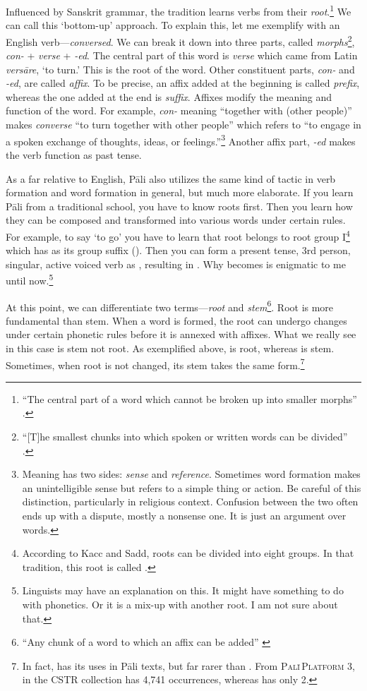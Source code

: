 Influenced by Sanskrit grammar, the tradition learns verbs from their \emph{root}.\footnote{``The central part of a word which cannot be broken up into smaller morphs'' \citep[p.~389]{brownmiller:dict}.} We can call this `bottom-up' approach. To explain this, let me exemplify with an English verb---\emph{conversed}. We can break it down into three parts, called \emph{morphs}\footnote{``[T]he smallest chunks into which spoken or written words can be divided'' \citep[p.~294]{brownmiller:dict}.}, \emph{con-} + \emph{verse} + \emph{-ed}. The central part of this word is \emph{verse} which came from Latin \emph{vers\=are}, `to turn.' This is the root of the word. Other constituent parts, \emph{con-} and \emph{-ed}, are called \emph{affix}. To be precise, an affix added at the beginning is called \emph{prefix}, whereas the one added at the end is \emph{suffix}. Affixes modify the meaning and function of the word. For example, \emph{con-} meaning ``together with (other people)'' makes \emph{converse} ``to turn together with other people'' which refers to ``to engage in a spoken exchange of thoughts, ideas, or feelings.''\footnote{Meaning has two sides: \emph{sense} and \emph{reference}. Sometimes word formation makes an unintelligible sense but refers to a simple thing or action. Be careful of this distinction, particularly in religious context. Confusion between the two often ends up with a dispute, mostly a nonsense one. It is just an argument over words.} Another affix part, \emph{-ed} makes the verb function as past tense.

As a far relative to English, P\=ali also utilizes the same kind of tactic in verb formation and word formation in general, but much more elaborate. If you learn P\=ali from a traditional school, you have to know roots first. Then you learn how they can be composed and transformed into various words under certain rules. For example, to say `to go' you have to learn that root  belongs to root group I\footnote{According to Kacc and Sadd, roots can be divided into eight groups. In that tradition, this root is called .} which has  as its group suffix (). Then you can form a present tense, 3rd person, singular, active voiced verb as , resulting in . Why  becomes  is enigmatic to me until now.\footnote{Linguists may have an explanation on this. It might have something to do with phonetics. Or it is a mix-up with another root. I am not sure about that.}

At this point, we can differentiate two terms---\emph{root} and \emph{stem}\footnote{``Any chunk of a word to which an affix can be added'' \citep[p.~416]{brownmiller:dict}}. Root is more fundamental than stem. When a word is formed, the root can undergo changes under certain phonetic rules before it is annexed with affixes. What we really see in this case is stem not root. As exemplified above,  is root, whereas  is stem. Sometimes, when root is not changed, its stem takes the same form.\footnote{In fact,  has its uses in P\=ali texts, but far rarer than . From \textsc{Pal\=i\,Platform} 3, in the CSTR collection  has 4,741 occurrences, whereas  has only 2.}

